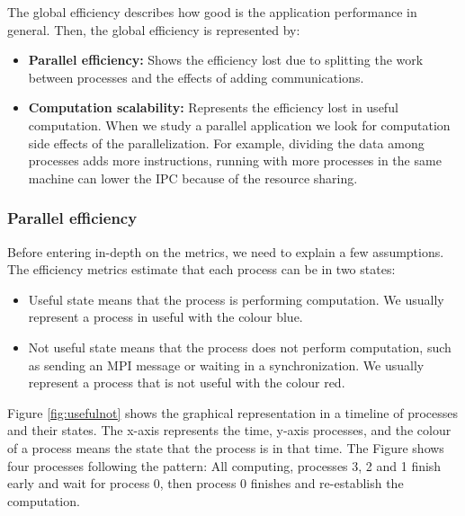 The global efficiency describes how good is the application performance in general. Then, the global efficiency is represented by:

\begin{itemize}
  \item \textbf{Parallel efficiency:} Shows the efficiency lost due to splitting the work between processes and the effects of adding communications.
  \item \textbf{Computation scalability:} Represents the efficiency lost in useful computation. When we study a parallel application we look for computation side effects of the parallelization. For example, dividing the data among processes adds more instructions, running with more processes in the same machine can lower the IPC because of the resource sharing.
\end{itemize}

\subsubsection{Parallel efficiency}
\label{pareff}

Before entering in-depth on the metrics, we need to explain a few assumptions. 
The efficiency metrics estimate that each process can be in two states:
\begin{itemize}
  \item Useful state means that the process is performing computation. We usually represent a process in useful with the colour blue.
  \item Not useful state means that the process does not perform computation, such as sending an MPI message or waiting in a synchronization. We usually represent a process that is not useful with the colour red.
\end{itemize}

Figure \ref{fig:usefulnot} shows the graphical representation in a timeline of processes and their states. The x-axis represents the time, y-axis processes, and the colour of a process means the state that the process is in that time. The Figure shows four processes following the pattern: All computing, processes 3, 2 and 1 finish early and wait for process 0, then process 0 finishes and re-establish the computation.

